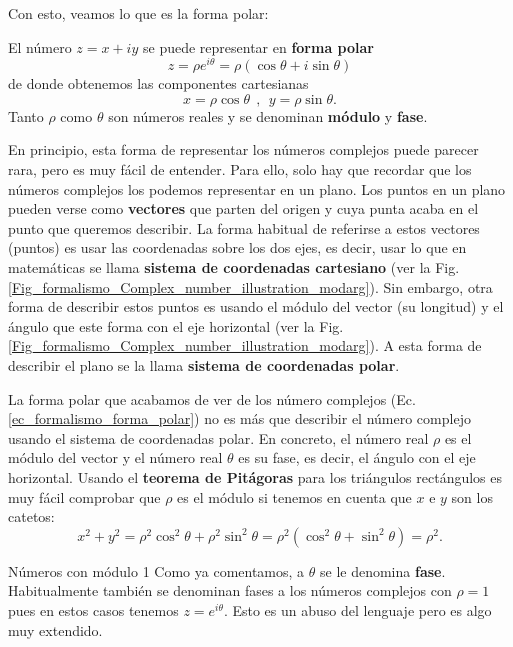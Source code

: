 \documentclass[a4paper,11pt]{book} %
\numberwithin{equation}{chapter}
\begin{document}
Con esto, veamos lo que es la forma polar:
	\begin{mybox_gray2}{}
	El número $z=x + i y$ se puede representar en \textbf{forma polar}
		\begin{equation}  \label{ec_formalismo_forma_polar}
		z = \rho e^{i\theta} = \rho (\cos\theta + i \sin\theta)  
		\end{equation}
	de donde obtenemos las componentes cartesianas 
		\begin{equation}
		x=\rho\cos\theta ~~,~~y=\rho\sin\theta.
		\end{equation}
 	Tanto $\rho$ como $\theta$ son números reales y se denominan \textbf{módulo} y \textbf{fase}.
	\end{mybox_gray2}
	
	En principio, esta forma de representar los números complejos puede parecer rara, pero es muy fácil de entender. Para ello, solo hay que recordar que los números complejos los podemos representar en un plano. Los puntos en un plano pueden verse como \textbf{vectores} que parten del origen y cuya punta acaba en el punto que queremos describir. La forma habitual de referirse a estos vectores (puntos) es usar las coordenadas sobre los dos ejes, es decir, usar lo que en matemáticas se llama \textbf{sistema de coordenadas cartesiano} (ver la Fig. \ref{Fig_formalismo_Complex_number_illustration_modarg}). Sin embargo, otra forma de describir estos puntos es usando el módulo del vector (su longitud) y el ángulo que este forma con el eje horizontal (ver la Fig. \ref{Fig_formalismo_Complex_number_illustration_modarg}). A esta forma de describir el plano se la llama \textbf{sistema de coordenadas polar}.
	
	La forma polar que acabamos de ver de los número complejos (Ec. \ref{ec_formalismo_forma_polar}) no es más que describir el número complejo usando el sistema de coordenadas polar. En concreto, el número real $\rho$ es el módulo del vector y el número real $\theta$ es su fase, es decir, el ángulo con el eje horizontal. Usando el \textbf{teorema de Pitágoras} para los triángulos rectángulos es muy fácil comprobar que $\rho$ es el módulo si tenemos en cuenta que $x$ e $y$ son los catetos:
	$$
	x^2 + y^2 = \rho^2 \cos^2 \theta + \rho^2 \sin^2 \theta = \rho^2 (\cos^2 \theta +  \sin^2 \theta) =  \rho^2.
	$$

	\begin{mybox_blue}{Números con módulo 1}
	Como ya comentamos, a $\theta$ se le denomina \textbf{fase}. Habitualmente también se denominan fases a los números complejos con $\rho =1$ pues en estos casos tenemos $z = e^{i \theta}$. Esto es un abuso del lenguaje pero es algo muy extendido.
	\end{mybox_blue}
\end{document}
